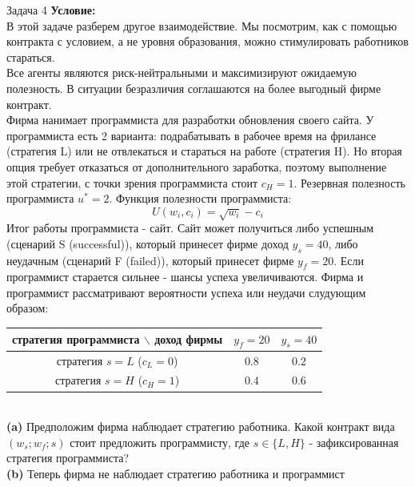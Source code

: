 \begin{mybox}{Задача 4}
    \indent\setlength{\parindent}{1em}\textbf{Условие:}\\
    \indent\setlength{\parindent}{1em}В этой задаче разберем другое взаимодействие. Мы посмотрим, как с помощью
    контракта с условием, а не уровня образования, можно стимулировать работников стараться.\\
    \indent\setlength{\parindent}{1em}Все агенты являются риск-нейтральными и максимизируют ожидаемую полезность. В
    ситуации безразличия соглашаются на более выгодный фирме контракт.\\
    \indent\setlength{\parindent}{1em}Фирма нанимает программиста для разработки обновления своего сайта. У программиста
    есть 2 варианта: подрабатывать в рабочее время на фрилансе (стратегия L) или не отвлекаться и стараться на работе
    (стратегия H). Но вторая опция требует отказаться от дополнительного заработка, поэтому выполнение этой стратегии, с
    точки зрения программиста стоит $c_H=1$. Резервная полезность программиста $u^*=2$. Функция полезности программиста:
    $$U(w_i,c_i)=\sqrt{w_i}-c_i$$
    \indent\setlength{\parindent}{1em}Итог работы программиста - сайт. Сайт может получиться либо успешным (сценарий S
    (successful)), который принесет фирме доход $y_s=40$, либо неудачным (сценарий F (failed)), который принесет фирме
    $y_f=20$. Если программист старается сильнее - шансы успеха увеличиваются. Фирма и программист рассматривают
    вероятности успеха или неудачи слудующим образом:\\
    \begin{center}
        \begin{tabular}{ c|c|c }
             стратегия программиста $\backslash$ доход фирмы & $y_f=20$ & $y_s=40$ \\
             \hline
             стратегия $s=L$ ($c_L=0$) & $0.8$ & $0.2$ \\
             \hline
             стратегия $s=H$ ($c_H=1$) & $0.4$ & $0.6$ \\
        \end{tabular}
    \end{center}\smallskip\\
    \indent\setlength{\parindent}{1em}\textbf{(a)} Предположим фирма наблюдает стратегию работника. Какой
    контракт вида $(w_s;w_f;s)$ стоит предложить программисту, где $s\in\{L,H\}$ - зафиксированная стратегия
    программиста?\smallskip\\
    \indent\setlength{\parindent}{1em}\textbf{(b)} Теперь фирма не наблюдает стратегию работника и программист

\end{mybox}
